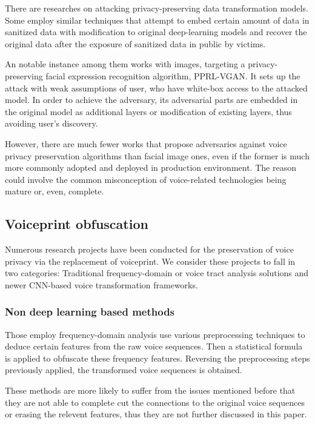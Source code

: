 \documentclass[journal]{IEEEtran} %
\begin{document}
\begin{CJK*}{UTF8}{gbsn}
There are researches on attacking privacy-preserving data transformation models. Some employ similar techniques that attempt to embed certain amount of data in sanitized data with modification to original deep-learning models and recover the original data after the exposure of sanitized data in public by victims. 

An notable instance among them works with images, targeting a privacy-preserving facial expression recognition algorithm, PPRL-VGAN. It sets up the attack with weak assumptions of user, who have white-box access to the attacked model. In order to achieve the adversary, its adversarial parts are embedded in the original model as additional layers or modification of existing layers, thus avoiding user's discovery.\cite{pprl-vgan,subvert}

However, there are much fewer works that propose adversaries against voice privacy preservation algorithms than facial image ones, even if the former is much more commonly adopted and deployed in production environment. The reason could involve the common misconception of voice-related technologies being mature or, even, complete.

\subsection{Voiceprint obfuscation}

Numerous research projects have been conducted for the preservation of voice privacy via the replacement of voiceprint. We consider these projects to fall in two categories: Traditional frequency-domain or voice tract analysis solutions and newer CNN-based voice transformation frameworks.

\subsubsection{Non deep learning based methods}

Those employ frequency-domain analysis use various preprocessing techniques to deduce certain features from the raw voice sequences. Then a statistical formula is applied to obfuscate these frequency features. Reversing the preprocessing steps previously applied, the transformed voice sequences is obtained.\cite{a9, a10, a11}

These methods are more likely to suffer from the issues mentioned before that they are not able to complete cut the connections to the original voice sequences or erasing the relevent features, thus they are not further discussed in this paper.


\end{CJK*}
\end{document}
